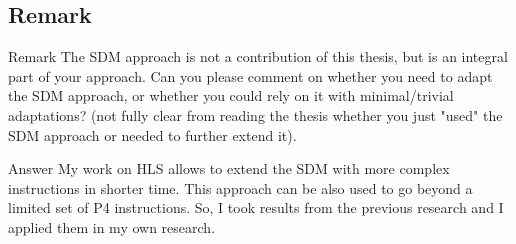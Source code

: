 \subsection{Remark \theRemarkCounter}
\begin{frame}[allowframebreaks]
    \begin{block}{Remark \theRemarkCounter}
       The SDM approach is not a contribution of this thesis, but is an integral part of your
       approach. Can you please comment on whether you need to adapt the SDM approach, or
       whether you could rely on it with minimal/trivial adaptations? (not fully clear from reading
       the thesis whether you just "used" the SDM approach or needed to further extend it).
    \end{block}
    
    \begin{exampleblock}{Answer}
        My work on HLS allows to extend the SDM with more complex instructions in shorter time.
        This approach can be also used to go beyond a limited set of P4 instructions.
        So, I took results from the previous research and I applied them in my own research.       
    \end{exampleblock}
\end{frame}

